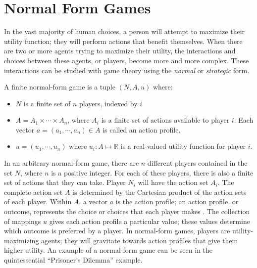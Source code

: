 \section{Normal Form Games}
In the vast majority of human choices, a person will attempt to maximize their utility function; they will perform actions that benefit themselves. When there are two or more agents trying to maximize their utility, the interactions and choices between these agents, or players, become more and more complex. These interactions can be studied with game theory using the \textit{normal} or \textit{strategic} form.
\begin{define}
  A finite normal-form game is a tuple $(N, A, u)$ where:
  \begin{itemize}
  \item $N$ is a finite set of $n$ players, indexed by $i$
  \item $A=A_1\times\cdots\times A_n$, where $A_i$ is a finite set of actions available to player $i$. Each vector $a=(a_1,\cdots ,a_n)\in A$ is called an action profile.
    \item $u=(u_1,\cdots ,u_n)$ where $u_i : A \mapsto\mathbb{R}$ is a real-valued utility function for player $i$. \cite{shoh09}
\end{itemize}
\end{define}

In an arbitrary normal-form game, there are $n$ different players contained in the set $N$, where $n$ is a positive integer. For each of these players, there is also a finite set of actions that they can take. Player $N_i$ will have the action set $A_i$. The complete action set $A$ is determined by the Cartesian product of the action sets of each player. Within $A$, a vector $a$ is the action profile; an action profile, or outcome, represents the choice or choices that each player makes \cite{osbo94}. The collection of mappings $u$ gives each action profile a particular value; these values determine which outcome is preferred by a player. In normal-form games, players are utility-maximizing agents; they will gravitate towards action profiles that give them higher utility. An example of a normal-form game can be seen in the quintessential ``Prisoner's Dilemma'' example.\\

